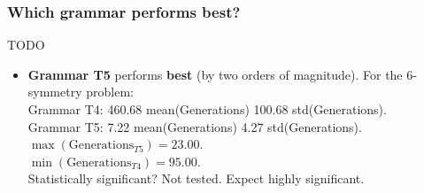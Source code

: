 \begin{frame}
\frametitle{
Which grammar performs best?
}
TODO \begin{itemize}
\item {\bf Grammar T5} performs {\bf best} (by two orders of magnitude).
        For the 6-symmetry problem:\\
       Grammar T4: 460.68 mean(Generations) 100.68 std(Generations).\\
       Grammar T5: 7.22 mean(Generations)     4.27 std(Generations).\\
       $\max(\mbox{Generations}_{T5})=23.00$. \\
       $\min(\mbox{Generations}_{T4})=95.00$. \\
 
Statistically significant? Not tested. Expect highly significant.
\end{itemize}
\end{frame}